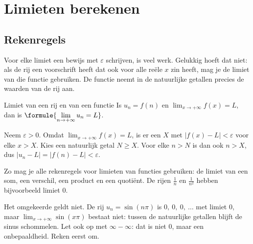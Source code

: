
\begin{oefeningen}
\end{oefeningen}

\section{Limieten berekenen}

\subsection{Rekenregels}

Voor elke limiet een bewijs met $\varepsilon$ schrijven, is veel werk. Gelukkig hoeft dat niet: als de rij een voorschrift heeft dat ook voor alle reële $x$ zin heeft, mag je de limiet van die functie gebruiken. De functie neemt in de natuurlijke getallen precies de waarden van de rij aan.

\begin{theorie}
\begin{stelling}{Limiet van een rij en van een functie}
Is $u_n = f(n)$ en $\displaystyle\lim_{x\to+\infty} f(x) = L$, dan is $\formule{\displaystyle\lim_{n\to+\infty} u_n = L}$.
\end{stelling}

\begin{bewijs}
Neem $\varepsilon > 0$. Omdat $\lim_{x\to+\infty} f(x) = L$, is er een $X$ met $|f(x) - L| < \varepsilon$ voor elke $x > X$. Kies een natuurlijk getal $N \geqslant X$. Voor elke $n > N$ is dan ook $n > X$, dus $|u_n - L| = |f(n) - L| < \varepsilon$.
\end{bewijs}
\end{theorie}

Zo mag je alle rekenregels voor limieten van functies gebruiken: de limiet van een som, een verschil, een product en een quotiënt. De rijen $\tfrac1n$ en $\tfrac{1}{n^2}$ hebben bijvoorbeeld limiet 0.

Het omgekeerde geldt niet. De rij $u_n = \sin(n\pi)$ is $0,\ 0,\ 0,\ \ldots$ met limiet 0, maar $\lim_{x\to+\infty} \sin(x\pi)$ bestaat niet: tussen de natuurlijke getallen blijft de sinus schommelen. Let ook op met $\infty - \infty$: dat is niet 0, maar een onbepaaldheid. Reken eerst om.

